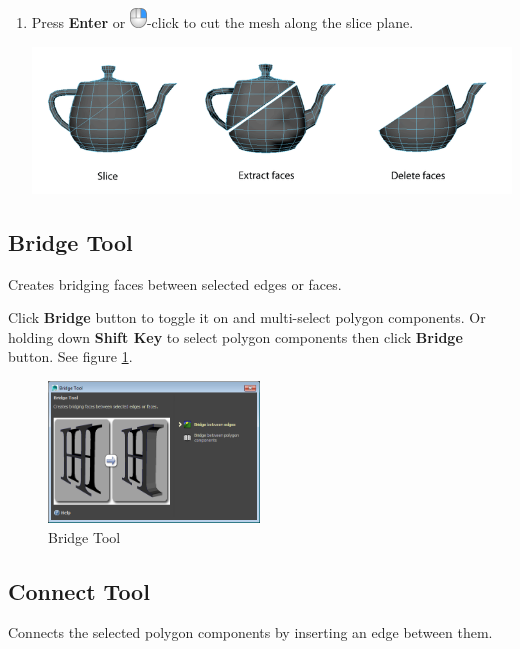 \begin{enumerate}
	\item Press \textbf{Enter} or \includegraphics[scale=0.6]{"figures/cut plane using mouse"}-click to cut the mesh along the slice plane.
	
	\begin{center}
		\includegraphics[width=\textwidth]{"figures/multi-cut slice"}
	\end{center}
	
\end{enumerate}



\subsection{Bridge Tool}
Creates bridging faces between selected edges or faces.

Click \textbf{Bridge} button to toggle it on and multi-select polygon components. Or holding down \textbf{Shift Key} to select polygon components then click \textbf{Bridge} button. See figure \ref{fig: Bridge Tool}.
\begin{figure}[h]
	\centering
	\includegraphics[width=0.5\textwidth]{"figures/Bridge Tool"}
	\caption{Bridge Tool}\label{fig: Bridge Tool}
\end{figure}

\subsection{Connect Tool}
Connects the selected polygon components by inserting an edge between them.

